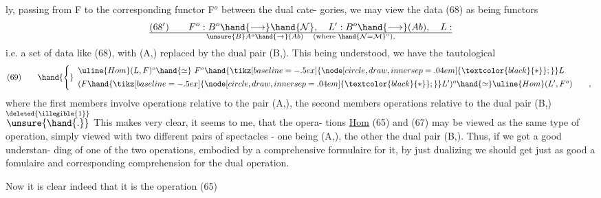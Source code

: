 ly,  passing from F to the corresponding functor F$^{o}$ between the dual cate-%
gories,  we may view the data (68) as being functors
\[ (68') \qquad F^{o} : B^{o} \hand{\longrightarrow} \hand{\mathcal{N}} , \quad L' : B^{o} \hand{\longrightarrow} (Ab) , \quad L : \over{\unsure{B}}{A}^{o} \hand{\rightarrow} (Ab) \quad (\text{where } \hand{\mathcal{N} = \mathcal{M}}^{o}), \]
i.e. a set of data like (68),  with (A,)  replaced by the dual pair
(B,).  This being understood,  we have the tautological  
\[ (69) \qquad \hand{\Biggl\{} \begin{array}{l} \uline{Hom}(L,F)^{o} \hand{\simeq}\ F^{o} \hand{\mathbin{\tikz[baseline=-.5ex]{\node[circle,draw,inner sep=.04em] {\ensuremath{\textcolor{black}{*}}};}}} L \\[1ex] (F \hand{\mathbin{\tikz[baseline=-.5ex]{\node[circle,draw,inner sep=.04em] {\ensuremath{\textcolor{black}{*}}};}}} L')^{o} \hand{\simeq} \uline{Hom}(L',F^{o}) \qquad , \end{array} \]
where the first members  involve operations relative to the pair
(A,),  the second members operations relative to the dual pair (B,)\(\overset{\deleted{\illegible{1}}}{\unsure{\hand{.}}}\)
This makes very clear, it seems to me,  that  the opera-%
tions  \uline{Hom}  (65)  and  \hand{$\mathbin{\tikz[baseline=-.5ex]{\node[circle,draw,inner sep=.04em] {\ensuremath{\textcolor{black}{*}}};}}$} (67) may be viewed as the same type of operation,
simply viewed with two different pairs of spectacles  -  one being (A,),
the other the dual pair (B,).  Thus,  if we  got a good understan-%
ding of one of the two operations,  embodied by a comprehensive formulaire
for it,  by just dualizing we should get just as good a fomulaire and
corresponding comprehension for the dual operation.

Now it is clear\unsure{\hand{,}} indeed that it is the  operation (65)

